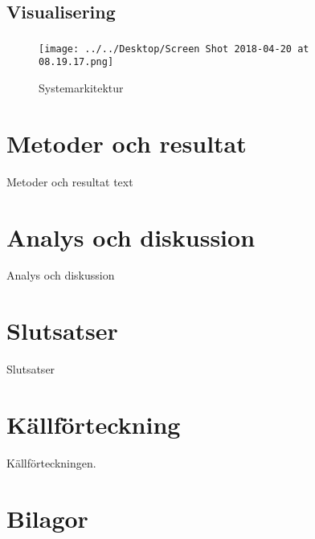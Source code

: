 \documentclass{kththesis}
\begin{document}
\section{Visualisering} 
\subsection{} 

\begin{figure}[hbtp]
\centering
\texttt{[image: ../../Desktop/Screen Shot 2018-04-20 at 08.19.17.png]}
\caption{Systemarkitektur}
\end{figure}



\chapter{Metoder och resultat}
Metoder och resultat text
\blindtext


\chapter{Analys och diskussion}
Analys och diskussion
\blindtext


\chapter{Slutsatser}
Slutsatser
\blindtext

\chapter{Källförteckning}
Källförteckningen.


\chapter{Bilagor}
\end{document}
